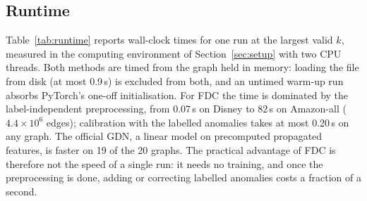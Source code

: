 \documentclass[pdflatex,sn-mathphys-ay]{sn-jnl}
\theoremstyle{plain}
\theoremstyle{remark}
\begin{document}
\subsection{Runtime}\label{sec:runtime}

Table~\ref{tab:runtime} reports wall-clock times for one run at the largest valid $k$, measured in the computing environment of Section~\ref{sec:setup} with two CPU threads. Both methods are timed from the graph held in memory: loading the file from disk (at most 0.9\,s) is excluded from both, and an untimed warm-up run absorbs PyTorch's one-off initialisation. For FDC the time is dominated by the label-independent preprocessing, from 0.07\,s on Disney to 82\,s on Amazon-all ($4.4\times10^6$ edges); calibration with the labelled anomalies takes at most 0.20\,s on any graph. The official GDN, a linear model on precomputed propagated features, is faster on 19 of the 20 graphs. The practical advantage of FDC is therefore not the speed of a single run: it needs no training, and once the preprocessing is done, adding or correcting labelled anomalies costs a fraction of a second.
\end{document}
